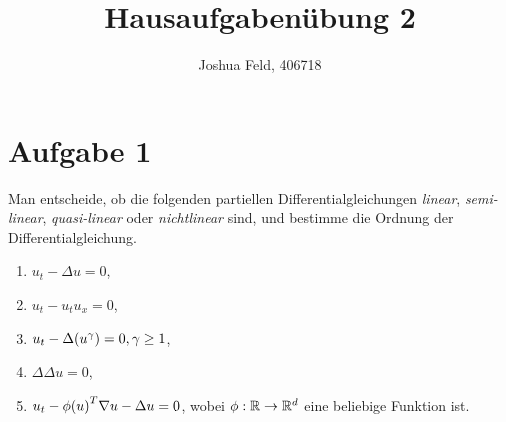 \documentclass{exercise}
\institute{Applied and Computational Mathematics}
\title{Hausaufgabenübung 2}
\author{Joshua Feld, 406718}
\begin{document}
    \maketitle


    \section*{Aufgabe 1}

    \begin{problem}
        Man entscheide, ob die folgenden partiellen Differentialgleichungen \emph{linear}, \emph{semi-linear}, \emph{quasi-linear} oder \emph{nichtlinear} sind, und bestimme die Ordnung der Differentialgleichung.
        \begin{enumerate}
            \item \(u_t - \Delta u = 0\),
            \item \(u_t - u_t u_x = 0\),
            \item \(u_t - \Delta\parentheses*{u^\gamma} = 0, \gamma \ge 1\),
            \item \(\Delta\Delta u = 0\),
            \item \(u_t - \phi\parentheses*{u}^T \nabla u - \Delta u = 0\), wobei \(\phi: \mathbb{R} \to \mathbb{R}^d\) eine beliebige Funktion ist. 
        \end{enumerate}
    \end{problem}
\end{document}

